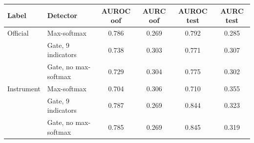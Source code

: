 \begin{tabular}{llcccc}
\hline
Label & Detector & AUROC oof & AURC oof & AUROC test & AURC test \\
\hline
Official & Max-softmax & 0.786 & 0.269 & 0.792 & 0.285 \\
 & Gate, 9 indicators & 0.738 & 0.303 & 0.771 & 0.307 \\
 & Gate, no max-softmax & 0.729 & 0.304 & 0.775 & 0.302 \\
Instrument & Max-softmax & 0.704 & 0.306 & 0.710 & 0.355 \\
 & Gate, 9 indicators & 0.787 & 0.269 & 0.844 & 0.323 \\
 & Gate, no max-softmax & 0.785 & 0.269 & 0.845 & 0.319 \\
\hline
\end{tabular}
